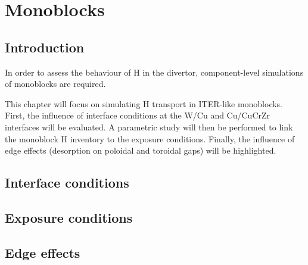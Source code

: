 \setchapterpreamble[u]{\margintoc}
\chapter{Monoblocks}\label{Chapter3}

\section{Introduction}

In order to assess the behaviour of H in the divertor, component-level simulations of monoblocks are required.

This chapter will focus on simulating H transport in ITER-like monoblocks.
First, the influence of interface conditions at the W/Cu and Cu/CuCrZr interfaces will be evaluated.
A parametric study will then be performed to link the monoblock H inventory to the exposure conditions.
Finally, the influence of edge effects (desorption on poloidal and toroidal gaps) will be highlighted.

\section{Interface conditions}




\section{Exposure conditions} \label{influence of exposure conditions}


\section{Edge effects} \label{3D edge effects}



